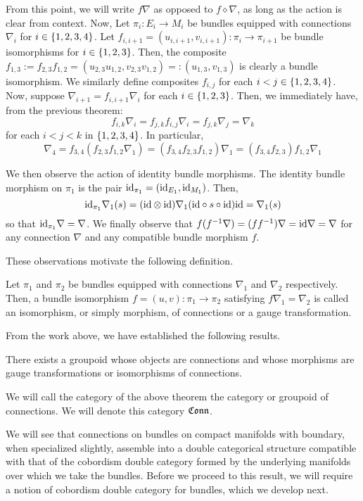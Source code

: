 From this point, we will write $f\nabla$ as opposed to $f \diamond \nabla$,
as long as the action is clear from context. Now, Let $\pi_i : E_i \to M_i$ be
bundles equipped with connections
$\nabla_i$ for $i \in \set{1, 2, 3, 4}$. Let
$f_{i, i + 1} = (u_{i, i + 1}, v_{i, i + 1}) : \pi_{i} \to \pi_{i + 1}$
be bundle isomorphisms for $i \in \set{1, 2, 3}$. Then, the composite
$f_{1, 3} := f_{2, 3}f_{1, 2} = (u_{2, 3}u_{1, 2}, v_{2, 3}v_{1, 2})
=: (u_{1, 3}, v_{1, 3})$ is clearly a bundle isomorphism. We similarly define
composites $f_{i, j}$ for each $i < j \in \set{1, 2, 3, 4}$. Now, suppose
$\nabla_{i + 1} = f_{i, i + 1}\nabla_i$ for each $i \in \set{1, 2, 3}$. Then, we
immediately have, from the previous theorem:
\[
  f_{i, k}\nabla_i = f_{j, k}f_{i, j}\nabla_i = f_{j, k}\nabla_j = \nabla_k
\]
for each $i < j < k$ in $\set{1, 2, 3, 4}$. In particular,
\[
  \nabla_4
    = f_{3, 4}(f_{2, 3}f_{1, 2}\nabla_1)
    = (f_{3,4}f_{2,3}f_{1,2}) \nabla_1
    = (f_{3, 4}f_{2, 3})f_{1, 2}\nabla_1
\]

We then observe the action of identity bundle morphisms. The identity bundle
morphism on $\pi_1$ is the pair $\text{id}_{\pi_1} = (\text{id}_{E_1}, \text{id}_{M_1})$. Then,
\[
  \text{id}_{\pi_1}\nabla_1(s)
    = (\text{id} \otimes \text{id}) \nabla_1(\text{id} \circ s \circ \text{id}) \text{id}
    = \nabla_1(s)
\]
so that $\text{id}_{\pi_1}\nabla = \nabla$. We finally observe that
$f(f^{-1}\nabla) = (ff^{-1})\nabla = \text{id}\nabla = \nabla$ for any connection
$\nabla$ and any compatible bundle morphism $f$.

These observations motivate the following definition.
\begin{defn}
Let $\pi_1$ and $\pi_2$ be bundles equipped with connections $\nabla_1$ and
$\nabla_2$ respectively. Then, a bundle isomorphism
$f = (u, v) : \pi_1 \to \pi_2$ satisfying $f\nabla_1 = \nabla_2$ is called an
isomorphism, or simply morphism, of connections or a gauge transformation.
\end{defn}

From the work above, we have established the following results.
\begin{thm}
There exists a groupoid whose objects are connections and
whose morphisms are gauge transformations or isomorphisms of connections.
\end{thm}
\begin{defn}
We will call the category of the above theorem the category or groupoid of
connections. We will denote this category $\mathfrak{Conn}$.
\end{defn}

We will see that connections on bundles on compact manifolds with boundary, when
specialized slightly, assemble into a double categorical structure compatible
with that of the cobordism double category formed by the underlying manifolds
over which we take the bundles. Before we proceed to this result, we will
require a notion of cobordism double category for bundles, which we develop
next.

